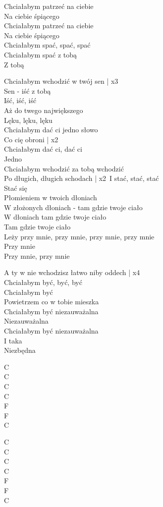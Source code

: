 \begin{text}
    Chciałabym patrzeć na ciebie\\
    Na ciebie śpiącego\\
    Chciałabym patrzeć na ciebie\\
    Na ciebie śpiącego\\
    Chciałabym spać, spać, spać\\
    Chciałabym spać z tobą\\
    Z tobą

    Chciałabym wchodzić w twój sen | x3\\
    Sen - iść z tobą\\
    Iść, iść, iść\\
    Aż do twego największego\\
    Lęku, lęku, lęku\\
    Chciałabym dać ci jedno słowo\\
    Co cię obroni | x2\\
    Chciałabym dać ci, dać ci\\
    Jedno\\
    Chciałabym wchodzić za tobą wchodzić\\
    Po długich, długich schodach | x2\
    I stać, stać, stać\\
    Stać się\\
    Płomieniem w twoich dłoniach\\
    W złożonych dłoniach - tam gdzie twoje ciało\\
    W dłoniach tam gdzie twoje ciało\\
    Tam gdzie twoje ciało\\
    Leży przy mnie, przy mnie, przy mnie, przy mnie\\
    Przy mnie\\
    Przy mnie, przy mnie

    A ty w nie wchodzisz łatwo niby oddech | x4\\
    Chciałabym być, być, być\\
    Chciałabym być\\
    Powietrzem co w tobie mieszka\\
    Chciałabym być niezauważalna\\
    Niezauważalna\\
    Chciałabym być niezauważalna\\
    I taka\\
    Niezbędna
\end{text}
\begin{chord}
    C\\
    C\\
    C\\
    C\\
    F\\
    F\\
    C

    C\\
    C\\
    C\\
    C\\
    F\\
    F\\
    C
\end{chord}